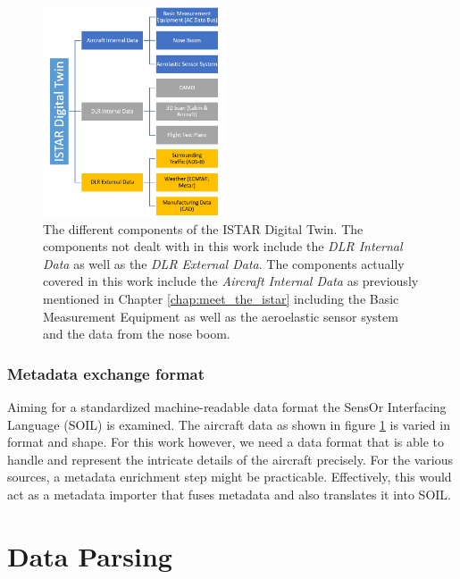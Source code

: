 \begin{figure}[h]
    \centering
    \includegraphics[width=0.48\textwidth]{03_figures/DIGECAT}
    \caption[Components of the Digital Twin]{The different components of the ISTAR Digital Twin. The components not dealt with in this work include the \textit{DLR Internal Data} as well as the \textit{DLR External Data}. The components actually covered in this work include the \textit{Aircraft Internal Data} as previously mentioned in Chapter \ref{chap:meet_the_istar} including the Basic Measurement Equipment as well as the aeroelastic sensor system and the data from the nose boom. \cite{arts_digital_2022}}
    \label{fig:digecat_data_sources}
\end{figure}

\subsubsection{Metadata exchange format}
\label{chap:2-metadata-format}

Aiming for a standardized machine-readable data format the SensOr Interfacing Language (SOIL) is examined. The aircraft data as shown in figure \ref{fig:digecat_data_sources} is varied in format and shape. For this work however, we need a data format that is able to handle and represent the intricate details of the aircraft precisely. For the various sources, a metadata enrichment step might be practicable. Effectively, this would act as a metadata importer that fuses metadata and also translates it into SOIL.

\section{Data Parsing}


